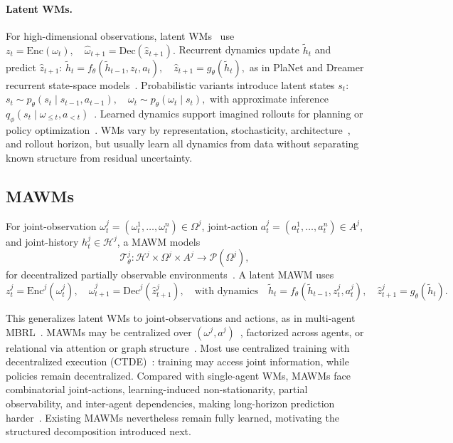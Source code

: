 \documentclass{article}
\theoremstyle{plain}
\theoremstyle{definition}
\theoremstyle{remark}
\begin{document}
\paragraph{Latent WMs.}
For high-dimensional observations, latent WMs~\cite{ha2018worldmodels,hafner2019dreamer} use
$
  z_t = \mathrm{Enc}(\omega_t), \quad \hat{\omega}_{t+1} = \mathrm{Dec}(\hat{z}_{t+1}).
$
Recurrent dynamics update $\tilde{h}_t$ and predict $\hat{z}_{t+1}$:
$  \tilde{h}_t = f_\theta(\tilde{h}_{t-1}, z_t, a_t), \quad \hat{z}_{t+1} = g_\theta(\tilde{h}_t),
$
as in PlaNet and Dreamer recurrent state-space models~\cite{hafner2018planet,hafner2019dreamer,hafner2020dreamerv2}. Probabilistic variants introduce latent states $s_t$: $s_t \sim p_\theta(s_t \mid s_{t-1}, a_{t-1}), \quad
  \omega_t \sim p_\theta(\omega_t \mid s_t),$
with approximate inference $q_\phi(s_t\mid\omega_{\le t},a_{<t})$~\cite{hafner2018planet,hafner2019dreamer}. Learned dynamics support imagined rollouts for planning or policy optimization~\cite{janner2019mbpo,hafner2019dreamer}.
WMs vary by representation, stochasticity, architecture~\cite{hafner2023dreamerv3}, and rollout horizon, but usually learn all dynamics from data without separating known structure from residual uncertainty.

\subsection{MAWMs}
\label{sec:mawm_formal}

For joint-observation $\omega^j_t=(\omega^1_t,\dots,\omega^n_t)\in\Omega^j$, joint-action $a^j_t=(a^1_t,\dots,a^n_t)\in A^j$, and joint-history $h^j_t\in\mathcal{H}^j$, a MAWM models
\begin{equation*}
  \mathcal{T}_\theta^j : \mathcal{H}^j \times \Omega^j \times A^j \rightarrow \mathcal{P}(\Omega^j),
\end{equation*}
for decentralized partially observable environments~\cite{oliehoek2016concise,marl-book,wang2022}. A latent MAWM uses
\[
  z^j_t = \mathrm{Enc}^j(\omega^j_t), \quad \hat{\omega}^j_{t+1} = \mathrm{Dec}^j(\hat{z}^j_{t+1}), \quad \text{with dynamics} \quad
  \tilde{h}_t = f_\theta(\tilde{h}_{t-1}, z^j_t, a^j_t), \quad \hat{z}^j_{t+1} = g_\theta(\tilde{h}_t).
\]

This generalizes latent WMs to joint-observations and actions, as in multi-agent MBRL~\cite{wang2025,willemsen2021mambpo}. MAWMs may be centralized over $(\omega^j,a^j)$~\cite{willemsen2021mambpo}, factorized across agents, or relational via attention or graph structure~\cite{marl-book,wang2022}. Most use centralized training with decentralized execution (CTDE)~\cite{oliehoek2016concise}: training may access joint information, while policies remain decentralized. Compared with single-agent WMs, MAWMs face combinatorial joint-actions, learning-induced non-stationarity, partial observability, and inter-agent dependencies, making long-horizon prediction harder~\cite{marl-book,wang2022}. Existing MAWMs nevertheless remain fully learned, motivating the structured decomposition introduced next.
\end{document}
